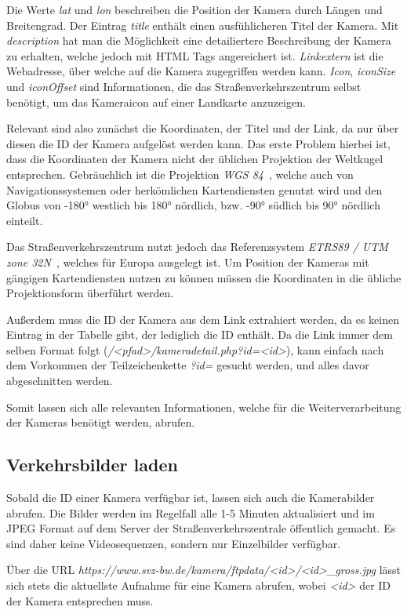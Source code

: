 Die Werte {\em lat} und {\em lon} beschreiben die Position der Kamera durch Längen und Breitengrad.
Der Eintrag {\em title} enthält einen ausfühlicheren Titel der Kamera. Mit {\em description} hat man die Möglichkeit eine detailiertere Beschreibung der Kamera zu erhalten, welche jedoch mit HTML Tags angereichert ist. {\em Linkextern} ist die Webadresse, über welche auf die Kamera zugegriffen werden kann. {\em Icon}, {\em iconSize} und {\em iconOffset} sind Informationen, die das Straßenverkehrszentrum selbst benötigt, um das Kameraicon auf einer Landkarte anzuzeigen.

Relevant sind also zunächst die Koordinaten, der Titel und der Link, da nur über diesen die ID der Kamera aufgelöst werden kann.
Das erste Problem hierbei ist, dass die Koordinaten der Kamera nicht der üblichen Projektion der Weltkugel entsprechen. Gebräuchlich ist die Projektion {\em WGS 84}~\cite{wgs84}, welche auch von Navigationssystemen oder herkömlichen Kartendiensten genutzt wird und den Globus von -180° westlich bis 180° nördlich, bzw. -90° südlich bis 90° nördlich einteilt.

Das Straßenverkehrszentrum nutzt jedoch das Referenzsystem {\em ETRS89 / UTM zone 32N}~\cite{etrs89}, welches für Europa ausgelegt ist.
Um Position der Kameras mit gängigen Kartendiensten nutzen zu können müssen die Koordinaten in die übliche Projektionsform überführt werden.

Außerdem muss die ID der Kamera aus dem Link extrahiert werden, da es keinen Eintrag in der Tabelle gibt, der lediglich die ID enthält.
Da die Link immer dem selben Format folgt ({\em /<pfad>/kameradetail.php?id=<id>}), kann einfach nach dem Vorkommen der Teilzeichenkette {\em ?id=} gesucht werden, und alles davor abgeschnitten werden.

Somit lassen sich alle relevanten Informationen, welche für die Weiterverarbeitung der Kameras benötigt werden, abrufen.

\subsection{Verkehrsbilder laden}
Sobald die ID einer Kamera verfügbar ist, lassen sich auch die Kamerabilder abrufen.
Die Bilder werden im Regelfall alle 1-5 Minuten aktualisiert und im JPEG Format auf dem Server der Straßenverkehrszentrale öffentlich gemacht.
Es sind daher keine Videosequenzen, sondern nur Einzelbilder verfügbar.

Über die URL {\em https://www.svz-bw.de/kamera/ftpdata/<id>/<id>\_gross.jpg} lässt sich stets die aktuellste Aufnahme für eine Kamera abrufen, wobei {\em <id>} der ID der Kamera entsprechen muss.


